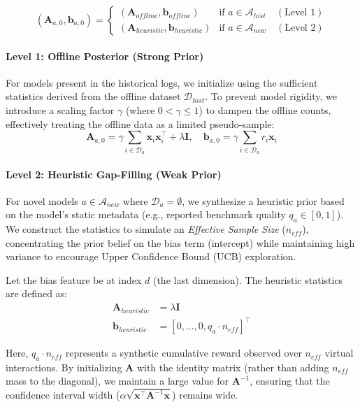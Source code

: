 \begin{equation}
    (\mathbf{A}_{a,0}, \mathbf{b}_{a,0}) = 
    \begin{cases} 
    (\mathbf{A}_{offline}, \mathbf{b}_{offline}) & \text{if } a \in \mathcal{A}_{hist} \quad (\text{Level 1}) \\
    (\mathbf{A}_{heuristic}, \mathbf{b}_{heuristic}) & \text{if } a \in \mathcal{A}_{new} \quad (\text{Level 2})
    \end{cases}
\end{equation}

\paragraph{Level 1: Offline Posterior (Strong Prior)}
For models present in the historical logs, we initialize using the sufficient statistics derived from the offline dataset $\mathcal{D}_{hist}$. To prevent model rigidity, we introduce a scaling factor $\gamma$ (where $0 < \gamma \le 1$) to dampen the offline counts, effectively treating the offline data as a limited pseudo-sample:
\begin{equation}
    \mathbf{A}_{a,0} = \gamma \sum_{i \in \mathcal{D}_a} \mathbf{x}_i \mathbf{x}_i^\top + \lambda \mathbf{I}, \quad \mathbf{b}_{a,0} = \gamma \sum_{i \in \mathcal{D}_a} r_i \mathbf{x}_i
\end{equation}

\paragraph{Level 2: Heuristic Gap-Filling (Weak Prior)}
For novel models $a \in \mathcal{A}_{new}$ where $\mathcal{D}_a = \emptyset$, we synthesize a heuristic prior based on the model's static metadata (e.g., reported benchmark quality $q_a \in [0,1]$). We construct the statistics to simulate an \textit{Effective Sample Size} ($n_{eff}$), concentrating the prior belief on the bias term (intercept) while maintaining high variance to encourage Upper Confidence Bound (UCB) exploration.

Let the bias feature be at index $d$ (the last dimension). The heuristic statistics are defined as:
\begin{align}
    \mathbf{A}_{heuristic} &= \lambda \mathbf{I} \\
    \mathbf{b}_{heuristic} &= [0, \dots, 0, q_a \cdot n_{eff}]^\top
\end{align}

Here, $q_a \cdot n_{eff}$ represents a synthetic cumulative reward observed over $n_{eff}$ virtual interactions. By initializing $\mathbf{A}$ with the identity matrix (rather than adding $n_{eff}$ mass to the diagonal), we maintain a large value for $\mathbf{A}^{-1}$, ensuring that the confidence interval width ($\alpha \sqrt{\mathbf{x}^\top \mathbf{A}^{-1} \mathbf{x}}$) remains wide.

